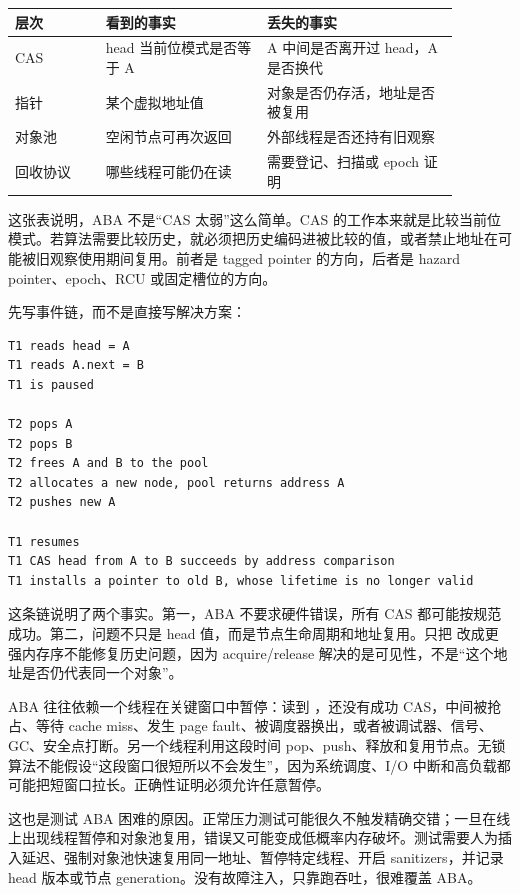 \begin{center}
\small
\begin{tabular}{@{}p{0.18\linewidth}p{0.32\linewidth}p{0.38\linewidth}@{}}
\toprule
层次 & 看到的事实 & 丢失的事实 \\
\midrule
CAS & head 当前位模式是否等于 A & A 中间是否离开过 head，A 是否换代 \\
指针 & 某个虚拟地址值 & 对象是否仍存活，地址是否被复用 \\
对象池 & 空闲节点可再次返回 & 外部线程是否还持有旧观察 \\
回收协议 & 哪些线程可能仍在读 & 需要登记、扫描或 epoch 证明 \\
\bottomrule
\end{tabular}
\end{center}

这张表说明，ABA 不是“CAS 太弱”这么简单。CAS 的工作本来就是比较当前位模式。若算法需要比较历史，就必须把历史编码进被比较的值，或者禁止地址在可能被旧观察使用期间复用。前者是 tagged pointer 的方向，后者是 hazard pointer、epoch、RCU 或固定槽位的方向。

先写事件链，而不是直接写解决方案：

\begin{lstlisting}[numbers=none,caption={Treiber stack ABA 的事件链}]
T1 reads head = A
T1 reads A.next = B
T1 is paused

T2 pops A
T2 pops B
T2 frees A and B to the pool
T2 allocates a new node, pool returns address A
T2 pushes new A

T1 resumes
T1 CAS head from A to B succeeds by address comparison
T1 installs a pointer to old B, whose lifetime is no longer valid
\end{lstlisting}

这条链说明了两个事实。第一，ABA 不要求硬件错误，所有 CAS 都可能按规范成功。第二，问题不只是 head 值，而是节点生命周期和地址复用。只把  改成更强内存序不能修复历史问题，因为 acquire/release 解决的是可见性，不是“这个地址是否仍代表同一个对象”。

ABA 往往依赖一个线程在关键窗口中暂停：读到 ，还没有成功 CAS，中间被抢占、等待 cache miss、发生 page fault、被调度器换出，或者被调试器、信号、GC、安全点打断。另一个线程利用这段时间 pop、push、释放和复用节点。无锁算法不能假设“这段窗口很短所以不会发生”，因为系统调度、I/O 中断和高负载都可能把短窗口拉长。正确性证明必须允许任意暂停。

这也是测试 ABA 困难的原因。正常压力测试可能很久不触发精确交错；一旦在线上出现线程暂停和对象池复用，错误又可能变成低概率内存破坏。测试需要人为插入延迟、强制对象池快速复用同一地址、暂停特定线程、开启 sanitizers，并记录 head 版本或节点 generation。没有故障注入，只靠跑吞吐，很难覆盖 ABA。

